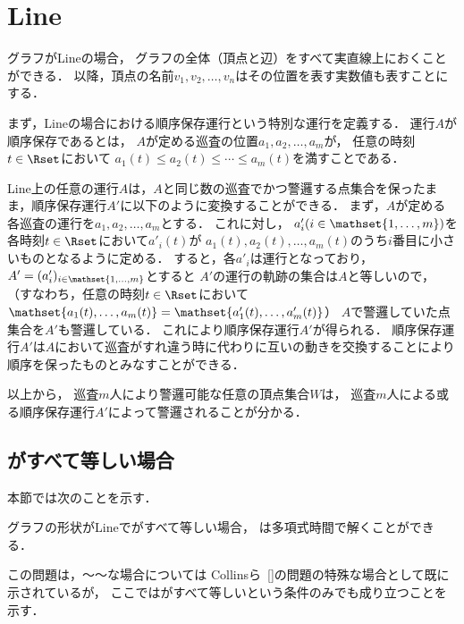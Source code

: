 
\section{Line}
\label{section: line}

グラフがLineの場合，
グラフの全体（頂点と辺）をすべて実直線上におくことができる．
以降，頂点の名前$v_1, v_2, \ldots, v_n$はその位置を表す実数値も表すことにする．

まず，Lineの場合における順序保存運行という特別な運行を定義する．
運行$A$が順序保存であるとは，
$A$が定める巡査の位置$a_1, a_2, \ldots, a_m$が，
任意の時刻$t \in \Rset$において
$a_1(t) \leq a_2(t) \leq \cdots \leq a_m(t)$を満すことである．

Line上の任意の運行$A$は，$A$と同じ数の巡査でかつ警邏する点集合を保ったまま，順序保存運行$A'$に以下のように変換することができる．
%
まず，$A$が定める各巡査の運行を$a_1, a_2, \ldots, a_m$とする．
これに対し，
$a'_i (i \in \mathset{1, \ldots, m})$を
各時刻$t \in \Rset$において$a' _i(t)$が
$a_1(t), a_2(t), \ldots, a_m(t)$のうち$i$番目に小さいものとなるように定める．
すると，各$a' _i$は運行となっており，
$A' = (a' _i)_{ i \in \mathset{1,\ldots, m} }$とすると
$A'$の運行の軌跡の集合は$A$と等しいので，
（すなわち，任意の時刻$t \in \Rset$において$\mathset{a_1(t), \ldots, a_m(t)} = \mathset{a'_1(t), \ldots, a'_m(t)}$）
$A$で警邏していた点集合を$A'$も警邏している．
これにより順序保存運行$A'$が得られる．
%
順序保存運行$A'$は$A$において巡査がすれ違う時に代わりに互いの動きを交換することにより順序を保ったものとみなすことができる．

以上から，
巡査$m$人により警邏可能な任意の頂点集合$W$は，
巡査$m$人による或る順序保存運行$A'$によって警邏されることが分かる．





\subsection{{\timelimit}がすべて等しい場合}
\label{subsec:LineUnaryTimelimit}




本節では次のことを示す．

\begin{theo}
    \label{theo:LineEqualTimelimit}
    グラフの形状がLineで{\timelimit}がすべて等しい場合，
    {\patrolling}は多項式時間で解くことができる．
\end{theo}

この問題は，～～な場合については Collinsら~\ref{}の問題の特殊な場合として既に示されているが，
ここでは{\timelimit}がすべて等しいという条件のみでも成り立つことを示す．


